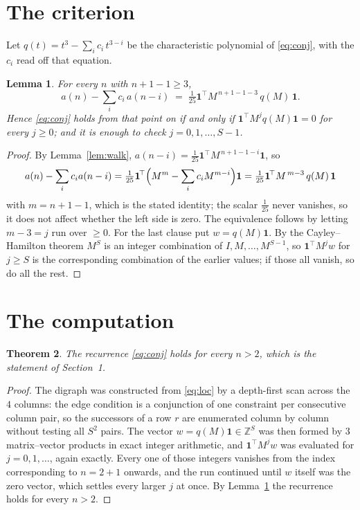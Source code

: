 \documentclass[11pt,a4paper]{article}
\theoremstyle{plain}
\newtheorem{theorem}{Theorem}
\newtheorem{lemma}[theorem]{Lemma}
\theoremstyle{definition}
\begin{document}
\section{The criterion}

Let $q(t)=t^{3}-\sum_i c_i\,t^{3-i}$ be the characteristic polynomial of
\eqref{eq:conj}, with the $c_i$ read off that equation.

\begin{lemma}\label{lem:crit}
For every $n$ with $n+1-1\ge3$,
\[
a(n)-\sum_i c_i\,a(n-i)\;=\;\tfrac1{25}\mathbf{1}^{\!\top}M^{\,n+1-1-3}\,q(M)\,\mathbf{1} .
\]
Hence \eqref{eq:conj} holds from that point on if and only if
$\mathbf{1}^{\!\top}M^{j}q(M)\mathbf{1}=0$ for every $j\ge0$; and it is enough to check
$j=0,1,\dots,S-1$.
\end{lemma}

\begin{proof}
By Lemma~\ref{lem:walk}, $a(n-i)=\tfrac1{25}\mathbf{1}^{\!\top}M^{\,n+1-1-i}\mathbf{1}$, so
\[
a(n)-\sum_i c_i a(n-i)
=\tfrac1{25}\mathbf{1}^{\!\top}\Bigl(M^{m}-\sum_i c_i M^{m-i}\Bigr)\mathbf{1}
=\tfrac1{25}\mathbf{1}^{\!\top}M^{\,m-3}\,q(M)\,\mathbf{1}
\]
with $m=n+1-1$, which is the stated identity; the scalar $\tfrac1{25}$ never vanishes, so
it does not affect whether the left side is zero. The equivalence follows by letting
$m-3=j$ run over $\ge0$. For the last clause put $w=q(M)\mathbf{1}$. By the
Cayley--Hamilton theorem $M^{S}$ is an integer combination of $I,M,\dots,M^{S-1}$, so
$\mathbf{1}^{\!\top}M^{j}w$ for $j\ge S$ is the corresponding combination of the earlier
values; if those all vanish, so do all the rest.
\end{proof}

\section{The computation}

\begin{theorem}
The recurrence \eqref{eq:conj} holds for every $n>2$, which is the statement of
Section~1.
\end{theorem}

\begin{proof}
The digraph was constructed from \eqref{eq:loc} by a depth-first scan across the $4$
columns: the edge condition is a conjunction of one constraint per consecutive column
pair, so the successors of a row $r$ are enumerated column by column without testing all
$S^2$ pairs. The vector $w=q(M)\mathbf{1}\in\mathbb{Z}^{S}$ was then formed by $3$
matrix--vector products in exact integer arithmetic, and $\mathbf{1}^{\!\top}M^{j}w$ was
evaluated for $j=0,1,\dots$, again exactly. Every one of those integers vanishes from the
index corresponding to $n=2+1$ onwards, and the run continued until $w$ itself was the
zero vector, which settles every larger $j$ at once. By Lemma~\ref{lem:crit} the recurrence
holds for every $n>2$.
\end{proof}
\end{document}
